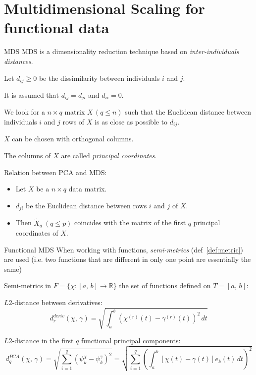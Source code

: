 \section{Multidimensional Scaling for functional data}

\begin{recap}{MDS}{}
MDS is a dimensionality reduction technique based on \emph{inter-individuals distances}.

Let $d_{ij} \geq 0$ be the dissimilarity between individuals $i$ and $j$.

It is assumed that $d_{ij} = d_{ji}$ and $d_{ii} = 0$.

We look for a $n \times q$ matrix $X\, (q \leq n)$ such that
the Euclidean distance between individuals $i$ and $j$ rows of $X$ is
as close as possible to $d_{ij}$.

$X$ can be chosen with orthogonal columns.

The columns of $X$ are called \emph{principal coordinates}.

\tcbline
Relation between PCA and MDS:
\begin{itemize}
    \item Let $X$ be a $n \times q$ data matrix.
    \item $d_{ji}$ be the Euclidean distance between rows $i$ and $j$ of $X$.
    \item Then $\tilde X_q\;(q \leq p)$ coincides with the matrix of the first
        $q$ principal coordinates of $X$.
\end{itemize}
\end{recap}

\begin{definition}{Functional MDS}{}
    When working with functions, \emph{semi-metrics} (def~\ref{def:metric}) are used (i.e. two
    functions that are different in only one point are essentially the same)
\end{definition}

\begin{example}{Semi-metrics in $F = \{\chi : [a,\,b] \to \mathds R\}$}{}
    the set of functions defined on $T = [a,\,b]$:

    $L2$-distance between derivatives:
    \begin{equation*}
        d_r^{deriv}(\chi,\,\gamma) = \sqrt{
            \int_a^b \left(
                \chi^{(r)}(t) - \gamma^{(r)}(t)
            \right)^2 \,dt
        }
    \end{equation*}

    $L2$-distance in the first $q$ functional principal components:
    \begin{equation*}
        d_q^{PCA}(\chi,\,\gamma) = \sqrt{
            \sum_{i=1}^q \left(
                \psi_k^\chi - \psi_k^\gamma
            \right)^2
        } = \sqrt{
            \sum_{i=1}^q \left(
                \int_a^b \left[
                    \chi(t) - \gamma(t)
                \right] e_k(t) \,dt
            \right)^2
        }
    \end{equation*}
\end{example}


